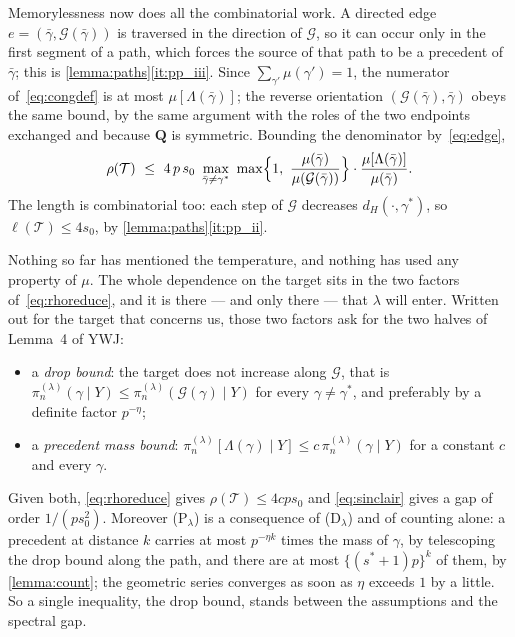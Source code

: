 \documentclass[aos]{imsart}
\theoremstyle{plain}
\theoremstyle{definition}
\begin{document}
    Memorylessness now does all the combinatorial work. A directed edge
    $e=(\bar\gamma,\mathcal{G}(\bar\gamma))$ is traversed in the direction
    of $\mathcal{G}$, so it can occur only in the first segment of a path,
    which forces the source of that path to be a precedent of $\bar\gamma$;
    this is \cref{lemma:paths}\ref{it:pp_iii}. Since
    $\sum_{\gamma'}\mu(\gamma')=1$, the numerator of~\eqref{eq:congdef} is
    at most $\mu[\Lambda(\bar\gamma)]$; the reverse orientation
    $(\mathcal{G}(\bar\gamma),\bar\gamma)$ obeys the same bound, by the
    same argument with the roles of the two endpoints exchanged and because
    $\mathbf{Q}$ is symmetric. Bounding the denominator
    by~\eqref{eq:edge},
    \begin{equation}
        \label{eq:rhoreduce}
        \rho(\mathcal{T})\ \leq\ 4\,p\,s_0\
        \max_{\bar\gamma\neq\gamma^{\ast}}\
        \max\Bigl\{1,\
        \frac{\mu(\bar\gamma)}{\mu(\mathcal{G}(\bar\gamma))}\Bigr\}
        \cdot
        \frac{\mu[\Lambda(\bar\gamma)]}{\mu(\bar\gamma)} .
    \end{equation}
    The length is combinatorial too: each step of $\mathcal{G}$ decreases
    $d_H(\cdot,\gamma^{\ast})$, so $\ell(\mathcal{T})\leq4s_0$, by
    \cref{lemma:paths}\ref{it:pp_ii}.

    Nothing so far has mentioned the temperature, and nothing has used any
    property of $\mu$. The whole dependence on the target sits in the two
    factors of~\eqref{eq:rhoreduce}, and it is there --- and only there ---
    that $\lambda$ will enter. Written out for the target that concerns us,
    those two factors ask for the two halves of Lemma~4 of YWJ:
    \begin{itemize}[leftmargin=3.2em]
        \item[(D$_\lambda$)] a \emph{drop bound}: the target does not
        increase along $\mathcal{G}$, that is
        $\pi_n^{(\lambda)}(\gamma\mid Y)\leq
        \pi_n^{(\lambda)}(\mathcal{G}(\gamma)\mid Y)$ for every
        $\gamma\neq\gamma^{\ast}$, and preferably by a definite factor
        $p^{-\eta}$;
        \item[(P$_\lambda$)] a \emph{precedent mass bound}:
        $\pi_n^{(\lambda)}[\Lambda(\gamma)\mid Y]\leq
        c\,\pi_n^{(\lambda)}(\gamma\mid Y)$ for a constant $c$ and every
        $\gamma$.
    \end{itemize}
    Given both, \eqref{eq:rhoreduce} gives $\rho(\mathcal{T})\leq4cps_0$ and
    \eqref{eq:sinclair} gives a gap of order $1/(ps_0^{2})$. Moreover
    (P$_\lambda$) is a consequence of (D$_\lambda$) and of counting alone: a
    precedent at distance $k$ carries at most $p^{-\eta k}$ times the mass
    of $\gamma$, by telescoping the drop bound along the path, and there are
    at most $\{(s^{\ast}+1)p\}^{k}$ of them, by \cref{lemma:count}; the
    geometric series converges as soon as $\eta$ exceeds $1$ by a little. So
    a single inequality, the drop bound, stands between the assumptions and
    the spectral gap.
\end{document}
